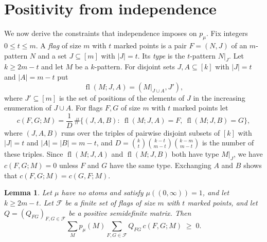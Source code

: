 \documentclass[11pt]{amsart}
\newtheorem{lemma}[theorem]{Lemma}
\theoremstyle{definition}
\theoremstyle{remark}
\numberwithin{equation}{section}
\newcommand{\cF}{\mathcal{F}}
\newcommand{\fl}{\operatorname{fl}}
\begin{document}
\section{Positivity from independence}\label{sec:flags}

We now derive the constraints that independence imposes on $p_\mu$. Fix integers $0\le t\le m$. A \emph{flag} of size $m$ with $t$ marked points is a pair $F=(N,J)$ of an $m$-pattern $N$ and a set $J\subseteq[m]$ with $|J|=t$. Its \emph{type} is the $t$-pattern $N|_J$. Let $k\ge2m-t$ and let $M$ be a $k$-pattern. For disjoint sets $J,A\subseteq[k]$ with $|J|=t$ and $|A|=m-t$ put
\[
\fl(M;J,A)=(M|_{J\cup A},J'),
\]
where $J'\subseteq[m]$ is the set of positions of the elements of $J$ in the increasing enumeration of $J\cup A$. For flags $F,G$ of size $m$ with $t$ marked points let
\begin{equation}\label{eq:c}
c(F,G;M)=\frac1{D}\,\#\bigl\{(J,A,B):\ \fl(M;J,A)=F,\ \fl(M;J,B)=G\bigr\},
\end{equation}
where $(J,A,B)$ runs over the triples of pairwise disjoint subsets of $[k]$ with $|J|=t$ and $|A|=|B|=m-t$, and $D=\binom kt\binom{k-t}{m-t}\binom{k-m}{m-t}$ is the number of these triples. Since $\fl(M;J,A)$ and $\fl(M;J,B)$ both have type $M|_J$, we have $c(F,G;M)=0$ unless $F$ and $G$ have the same type. Exchanging $A$ and $B$ shows that $c(F,G;M)=c(G,F;M)$.

\begin{lemma}\label{lem:pos}
Let $\mu$ have no atoms and satisfy $\mu((0,\infty))=1$, and let $k\ge2m-t$. Let $\cF$ be a finite set of flags of size $m$ with $t$ marked points, and let $Q=(Q_{FG})_{F,G\in\cF}$ be a positive semidefinite matrix. Then
\[
\sum_Mp_\mu(M)\sum_{F,G\in\cF}Q_{FG}\,c(F,G;M)\;\ge\;0.
\]
\end{lemma}
\end{document}

